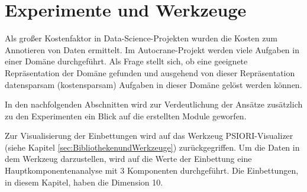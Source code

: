 \chapter{Experimente und Werkzeuge}
\label{chap:HauptteilMultiTaskLernen}
Als großer Kostenfaktor in Data-Science-Projekten wurden die Kosten zum Annotieren von Daten ermittelt. Im Autocrane-Projekt werden viele Aufgaben in einer Domäne durchgeführt. Als Frage stellt sich, ob eine geeignete Repräsentation der Domäne gefunden und ausgehend von dieser Repräsentation datensparsam (kostensparsam) Aufgaben in dieser Domäne gelöst werden können.  

In den nachfolgenden Abschnitten wird zur Verdeutlichung der Ansätze zusätzlich zu den Experimenten ein Blick auf die erstellten Module geworfen.

Zur Visualisierung der Einbettungen wird auf das Werkzeug PSIORI-Visualizer (siehe Kapitel \ref{sec:BibliothekenundWerkzeuge}) zurückgegriffen. Um die Daten in dem Werkzeug darzustellen, wird auf die Werte der Einbettung eine Hauptkomponentenanalyse mit 3 Komponenten durchgeführt. Die Einbettungen, in diesem Kapitel, haben die Dimension 10.  

